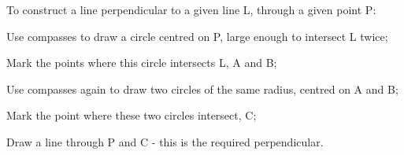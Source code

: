 To construct a line perpendicular to a given line L, through a 
given point P:
\par
Use compasses to draw a circle centred on P, large enough to intersect
L twice;
\par
Mark the points where this circle intersects L, A and B;
\par
Use compasses again to draw two circles of the same radius, centred
on A and B;
\par
Mark the point where these two circles intersect, C;
\par
Draw a line through P and C - this is the required perpendicular.